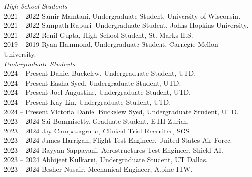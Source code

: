 
\textit{High-School Students} \\
2021 -- 2022 \hspace{28pt} Samir Mamtani, Undergraduate Student, University of Wisconsin. \\
2021 -- 2022 \hspace{28pt} Sampath Rapuri, Undergraduate Student, Johns Hopkins University. \\
2021 -- 2022 \hspace{28pt} Renil Gupta, High-School Student, St. Marks H.S. \\
2019 -- 2019 \hspace{28pt} Ryan Hammond, Undergraduate Student, Carnegie Mellon University. \\

\textit{Undergraduate Students} \\
2024 -- Present \hspace{14pt} Daniel Buckelew, Undergraduate Student, UTD. \\
2024 -- Present \hspace{14pt} Easha Syed, Undergraduate Student, UTD. \\
2024 -- Present \hspace{14pt} Joel Augustine, Undergraduate Student, UTD. \\
2024 -- Present \hspace{14pt} Kay Lin, Undergraduate Student, UTD. \\
2024 -- Present \hspace{14pt} Victoria Daniel Buckelew Syed, Undergraduate Student, UTD. \\
2023 -- 2024 \hspace{28pt} Sai Bommisetty, Graduate Student, ETH Zurich. \\
2023 -- 2024 \hspace{28pt} Joy Camposagrado, Clinical Trial Recruiter, SGS. \\
2023 -- 2024 \hspace{28pt} James Harrigan, Flight Test Engineer, United States Air Force. \\
2023 -- 2024 \hspace{28pt} Rayyan Sappayani, Aerostructures Test Engineer, Shield AI. \\
2023 -- 2024 \hspace{28pt} Abhijeet Kulkarni, Undergraduate Student, UT Dallas. \\
2023 -- 2024 \hspace{28pt} Besher Nusair, Mechanical Engineer, Alpine ITW. \\
